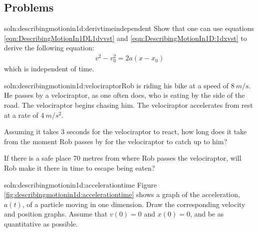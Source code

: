 \subsection{Problems}
\begin{problem}{soln:describingmotionin1d:derivtimeindependent}{
\label{prob:describingmotionin1d:derivtimeindependent} Show that one can use equations \ref{eqn:DescribingMotionIn1DL1dvvst} and \ref{eqn:DescribingMotionIn1D:1dxvst} to derive the following equation:
\begin{align*}
v^2-v_0^2=2a(x-x_0)
\end{align*}
which is independent of time.}
\end{problem}

\begin{problemParts}{soln:describingmotionin1d:velociraptor}{\label{prob:describingmotionin1d:velociraptor}Rob is riding his bike at a speed of $\SI{8}{m/s}$. He passes by a velociraptor, as one often does, who is eating by the side of the road. The velociraptor begins chasing him. The velociraptor accelerates from rest at a rate of $\SI{4}{m/s^2}$.} 
\item Assuming it takes 3 seconds for the velociraptor to react, how long does it take from the moment Rob passes by for the velociraptor to catch up to him? 
\item If there is a safe place 70 metres from where Rob passes the velociraptor, will Rob make it there in time to escape being eaten?  
\end{problemParts}

\begin{problem}{soln:describingmotionin1d:accelerationtime} {\label{prob:describingmotionin1d:accelerationtime}Figure \ref{fig:describingmotionin1d:accelerationtime} shows a graph of the acceleration, $a(t)$, of a particle moving in one dimension. Draw the corresponding velocity and position graphs. Assume that $v(0)=0$ and $x(0)=0$, and be as quantitative as possible.}
\end{problem}

\newpage
